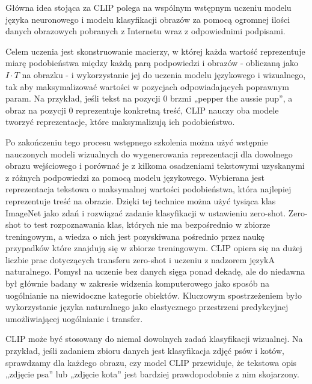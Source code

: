     Główna idea stojąca za CLIP polega na wspólnym wstępnym uczeniu modelu języka neuronowego i modelu klasyfikacji obrazów za pomocą ogromnej ilości danych obrazowych pobranych z Internetu wraz z odpowiednimi podpisami.



    Celem uczenia jest skonstruowanie macierzy, w której każda wartość reprezentuje miarę podobieństwa między każdą parą podpowiedzi i obrazów - obliczaną jako $I\cdot T$ na obrazku - i wykorzystanie jej do uczenia modelu językowego i wizualnego, tak aby maksymalizować wartości w pozycjach odpowiadających poprawnym param. Na przykład, jeśli tekst na pozycji 0 brzmi „pepper the aussie pup”, a obraz na pozycji 0 reprezentuje konkretną treść, CLIP nauczy oba modele tworzyć reprezentacje, które maksymalizują ich podobieństwo.

    Po zakończeniu tego procesu wstępnego szkolenia można użyć wstępnie nauczonych modeli wizualnych do wygenerowania reprezentacji dla dowolnego obrazu wejściowego i porównać je z kilkoma osadzeniami tekstowymi uzyskanymi z różnych podpowiedzi za pomocą modelu językowego.
    Wybierana jest reprezentacja tekstowa o maksymalnej wartości podobieństwa, która najlepiej reprezentuje treść na obrazie.
    Dzięki tej technice można użyć tysiąca klas ImageNet jako zdań i rozwiązać zadanie klasyfikacji w ustawieniu zero-shot.
    Zero-shot to test rozpoznawania klas, których nie ma bezpośrednio w zbiorze treningowym, a wiedza o nich jest pozyskiwana pośrednio przez naukę przypadków które znajdują się w zbiorze treningowym.
    CLIP opiera się na dużej liczbie prac dotyczących transferu zero-shot i uczeniu z nadzorem językA naturalnego.
    Pomysł na uczenie bez danych sięga ponad dekadę, ale do niedawna był głównie badany w zakresie widzenia komputerowego jako sposób na uogólnianie na niewidoczne kategorie obiektów.
    Kluczowym spostrzeżeniem było wykorzystanie języka naturalnego jako elastycznego przestrzeni predykcyjnej umożliwiającej uogólnianie i transfer.

    CLIP może być stosowany do niemal dowolnych zadań klasyfikacji wizualnej.
    Na przykład, jeśli zadaniem zbioru danych jest klasyfikacja zdjęć psów i kotów, sprawdzamy dla każdego obrazu, czy model CLIP przewiduje, że tekstowa opis „zdjęcie psa” lub „zdjęcie kota” jest bardziej prawdopodobnie z nim skojarzony.

